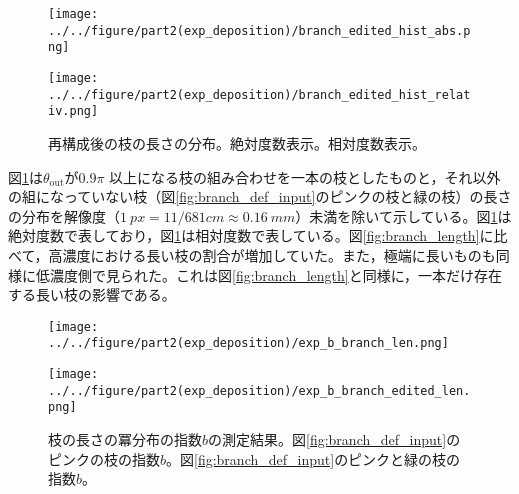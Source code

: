 \documentclass[autodetect-engine,dvi=dvipdfmx,a4paper,ja=standard,oneside,openany,11pt]{bxjsbook}
\begin{document}
\begin{figure}[htbp]
  \begin{minipage}
    {0.45\textwidth}
    \subcaption{}
    \centering
    \texttt{[image: ../../figure/part2(exp\_deposition)/branch\_edited\_hist\_abs.png]}
    \label{fig:branch_length_absolute_edited}
  \end{minipage}
  \begin{minipage}
    {0.45\textwidth}
    \subcaption{}
    \centering
    \texttt{[image: ../../figure/part2(exp\_deposition)/branch\_edited\_hist\_relativ.png]}
    \label{fig:branch_length_relativ_edited}
  \end{minipage}
  \caption{再構成後の枝の長さの分布。絶対度数表示。相対度数表示。}
  \label{fig:branch_length_edited}
\end{figure}

図\ref{fig:branch_length_edited}は$\theta_{\mathrm{out}}$が$0.9\pi$ 以上になる枝の組み合わせを一本の枝としたものと，それ以外の組になっていない枝（図\ref{fig:branch_def_input}のピンクの枝と緑の枝）の長さの分布を解像度（$\SI{1}{px}=11/681 \si{cm}\approx \SI{0.16}{mm}$）未満を除いて示している。図\ref{fig:branch_length_edited}は絶対度数で表しており，図\ref{fig:branch_length_edited}は相対度数で表している。図\ref{fig:branch_length}に比べて，高濃度における長い枝の割合が増加していた。また，極端に長いものも同様に低濃度側で見られた。これは図\ref{fig:branch_length}と同様に，一本だけ存在する長い枝の影響である。

\begin{figure}[htbp]
  \begin{minipage}
    {0.59\textwidth}
    \subcaption{}
    \centering
    \texttt{[image: ../../figure/part2(exp\_deposition)/exp\_b\_branch\_len.png]}
    \label{fig:exp_b_branch_len}
  \end{minipage}
  \begin{minipage}
    {0.39\textwidth}
    \subcaption{}
    \centering
    \texttt{[image: ../../figure/part2(exp\_deposition)/exp\_b\_branch\_edited\_len.png]}
    \label{fig:exp_b_branch_edited_len}
  \end{minipage}
  \caption{枝の長さの冪分布の指数$b$の測定結果。図\ref{fig:branch_def_input}のピンクの枝の指数$b$。図\ref{fig:branch_def_input}のピンクと緑の枝の指数$b$。}
  \label{fig:branch_length_exp}
\end{figure}
\end{document}

